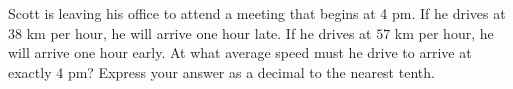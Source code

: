 Scott is leaving his office to attend a meeting that begins at 4 pm. If he drives at $38$ km per hour, he will arrive one hour late. If he drives at $57$ km per hour, he will arrive one hour early. At what average speed must he drive to arrive at exactly 4 pm? Express your answer as a decimal to the nearest tenth.
